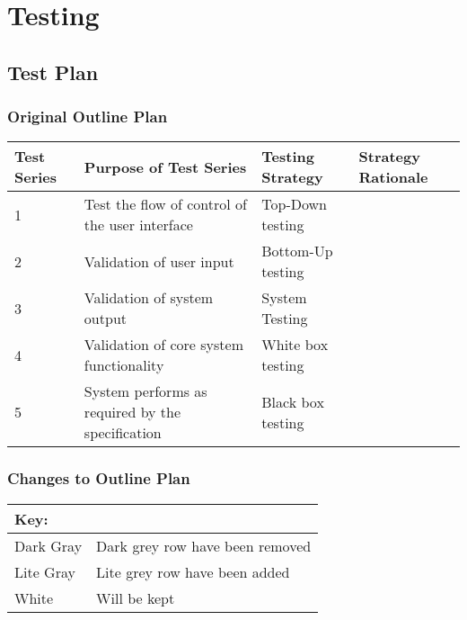 \chapter{Testing}

\section{Test Plan}

\begin{landscape}
\subsection{Original Outline Plan}

\begin{center}
    \begin{tabular}{|p{2cm}|p{5cm}|p{5cm}|p{4cm}|}
        \hline
        \textbf{Test Series} & \textbf{Purpose of Test Series} & \textbf{Testing Strategy} & \textbf{Strategy Rationale}\\ \hline
        1 & Test the flow of control of the user interface  & Top-Down testing &  \\ \hline
        2 & Validation of user input & Bottom-Up testing &  \\ \hline
        3 & Validation of system output & System Testing & \\ \hline
        4 & Validation of core system functionality & White box testing & \\ \hline
        5 & System performs as required by the specification & Black box testing & \\ \hline
    \end{tabular}
\end{center}

\subsection{Changes to Outline Plan}


\begin{tabular}{|l|l|}
\hline
Key: & \\ \hline
\rowcolor{DarkGray} Dark Gray & Dark grey row have been removed \\ \hline
\rowcolor{LiteGray} Lite Gray & Lite grey row have been added\\ \hline
White & Will be kept \\ \hline

\end{tabular}



\end{landscape}
